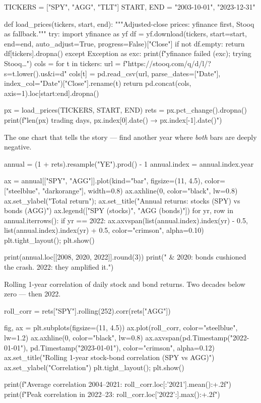 \documentclass{pyportfolios-note}
\begin{document}
\begin{notecode}
TICKERS = ["SPY", "AGG", "TLT"]
START, END = "2003-10-01", "2023-12-31"

def load_prices(tickers, start, end):
    """Adjusted-close prices: yfinance first, Stooq as fallback."""
    try:
        import yfinance as yf
        df = yf.download(tickers, start=start, end=end, auto_adjust=True, progress=False)["Close"]
        if not df.empty:
            return df[tickers].dropna()
    except Exception as exc:
        print(f"yfinance failed ({exc}); trying Stooq…")
    cols = {}
    for t in tickers:
        url = f"https://stooq.com/q/d/l/?s={t.lower()}.us&i=d"
        cols[t] = pd.read_csv(url, parse_dates=["Date"], index_col="Date")["Close"].rename(t)
    return pd.concat(cols, axis=1).loc[start:end].dropna()

px = load_prices(TICKERS, START, END)
rets = px.pct_change().dropna()
print(f"{len(px)} trading days, {px.index[0].date()} → {px.index[-1].date()}")
\end{notecode}


The one chart that tells the story — find another year where \textit{both} bars
are deeply negative.

\begin{notecode}
annual = (1 + rets).resample("YE").prod() - 1
annual.index = annual.index.year

ax = annual[["SPY", "AGG"]].plot(kind="bar", figsize=(11, 4.5),
                                  color=["steelblue", "darkorange"], width=0.8)
ax.axhline(0, color="black", lw=0.8)
ax.set_ylabel("Total return"); ax.set_title("Annual returns: stocks (SPY) vs bonds (AGG)")
ax.legend(["SPY (stocks)", "AGG (bonds)"])
for yr, row in annual.iterrows():
    if yr == 2022:
        ax.axvspan(list(annual.index).index(yr) - 0.5, list(annual.index).index(yr) + 0.5,
                   color="crimson", alpha=0.10)
plt.tight_layout(); plt.show()

print(annual.loc[[2008, 2020, 2022]].round(3))
print(" & 2020: bonds cushioned the crash. 2022: they amplified it.")
\end{notecode}


Rolling 1-year correlation of daily stock and bond returns. Two decades below
zero — then 2022.

\begin{notecode}
roll_corr = rets["SPY"].rolling(252).corr(rets["AGG"])

fig, ax = plt.subplots(figsize=(11, 4.5))
ax.plot(roll_corr, color="steelblue", lw=1.2)
ax.axhline(0, color="black", lw=0.8)
ax.axvspan(pd.Timestamp("2022-01-01"), pd.Timestamp("2023-01-01"), color="crimson", alpha=0.12)
ax.set_title("Rolling 1-year stock-bond correlation (SPY vs AGG)")
ax.set_ylabel("Correlation")
plt.tight_layout(); plt.show()

print(f"Average correlation 2004–2021: {roll_corr.loc[:'2021'].mean():+.2f}")
print(f"Peak correlation in 2022–23:   {roll_corr.loc['2022':].max():+.2f}")
\end{notecode}
\end{document}
